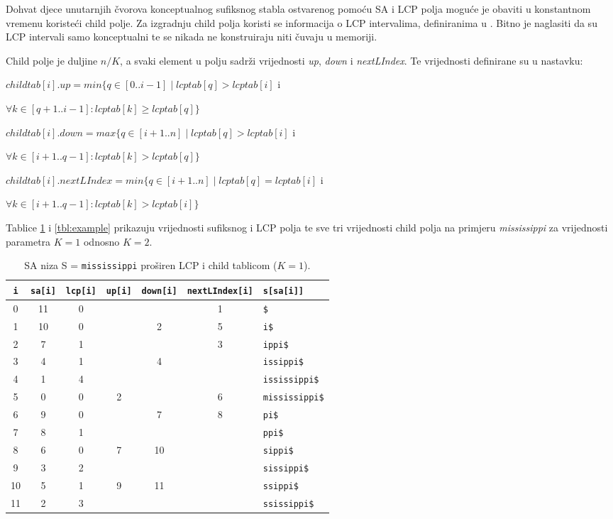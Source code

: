 \documentclass[times, utf8, seminar, numeric]{fer}
\begin{document}
Dohvat djece unutarnjih čvorova konceptualnog sufiksnog stabla ostvarenog pomoću SA i LCP polja moguće je obaviti u konstantnom vremenu koristeći child polje. Za izgradnju child polja koristi se informacija o LCP intervalima, definiranima u \cite{esa}. Bitno je naglasiti da su LCP intervali samo konceptualni te se nikada ne konstruiraju niti čuvaju u memoriji.

Child polje je duljine $n / K$, a svaki element u polju sadrži vrijednosti \textit{up}, \textit{down} i \textit{nextLIndex}. Te vrijednosti definirane su u nastavku:

$childtab[i].up = min\{q \in [0..i-1] \mid lcptab[q] > lcptab[i]$ i \\ \strut\hfill 
$\forall k \in [q+1..i-1] : lcptab[k] \geq lcptab[q]\}$

$childtab[i].down = max\{q \in [i+1..n] \mid lcptab[q] > lcptab[i]$ i \\ \strut\hfill
$\forall k \in [i+1..q-1] : lcptab[k] > lcptab[q]\}$

$childtab[i].nextLIndex = min\{q \in [i+1..n] \mid lcptab[q] = lcptab[i]$ i \\ \strut\hfill
$\forall k \in [i+1..q-1] : lcptab[k] > lcptab[i]\}$

Tablice \ref{tbl:example-full} i \ref{tbl:example} prikazuju vrijednosti sufiksnog i LCP polja te sve tri vrijednosti child polja na primjeru \textit{mississippi} za vrijednosti parametra $K = 1$ odnosno $K = 2$.

\begin{table}[h]
	\centering
  \caption{SA  niza S = \texttt{mississippi} proširen LCP i child tablicom ($K = 1$).}
	\label{tbl:example-full}
	
	\begin{tabular}{ccccccl}
		\hline
    \texttt{i} & \texttt{sa[i]} & \texttt{lcp[i]} & \texttt{up[i]} & \texttt{down[i]} & \texttt{nextLIndex[i]} & \texttt{s[sa[i]]} \\ \hline
     0 & 11 &  0 &    &    &  1 & \texttt{\$} \\
     1 & 10 &  0 &    &  2 &  5 & \texttt{i\$} \\
     2 &  7 &  1 &    &    &  3 & \texttt{ippi\$} \\
     3 &  4 &  1 &    &  4 &    & \texttt{issippi\$} \\
     4 &  1 &  4 &    &    &    & \texttt{ississippi\$} \\
     5 &  0 &  0 &  2 &    &  6 & \texttt{mississippi\$} \\
     6 &  9 &  0 &    &  7 &  8 & \texttt{pi\$} \\
     7 &  8 &  1 &    &    &    & \texttt{ppi\$} \\
     8 &  6 &  0 &  7 & 10 &    & \texttt{sippi\$} \\
     9 &  3 &  2 &    &    &    & \texttt{sissippi\$} \\
    10 &  5 &  1 &  9 & 11 &    & \texttt{ssippi\$} \\
    11 &  2 &  3 &    &    &    & \texttt{ssissippi\$} \\ \hline
	\end{tabular}
\end{table}
\end{document}
